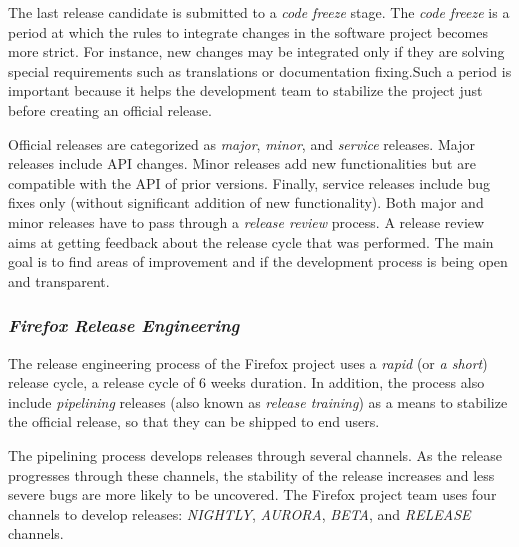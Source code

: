 The last release candidate is submitted to a {\em code freeze} stage. The {\em
code freeze} is a period at which the rules to integrate changes in the software
project becomes more strict. For instance, new changes may be integrated only if
they are solving special requirements such as translations or documentation
fixing.\footnotemark[15] Such a period is important because it helps the
development team to stabilize the project just before creating an official
release.

Official releases are categorized as {\em major}, {\em minor}, and {\em service} 
releases.
Major releases include API changes. Minor releases add new functionalities but
are compatible with the API of prior versions. Finally, service releases include
bug fixes only (\ie without significant addition of new functionality). Both
major and minor releases have to pass through a {\em release review} process. A
release review aims at getting feedback about the release cycle that was
performed. The main goal is to find areas of improvement and if the development
process is being open and
transparent.

\subsubsection*{\textbf{\textit{Firefox Release Engineering}}}\label{firefox:releng}

The release engineering process of the Firefox project uses a {\em rapid} (or
{\em a short}) release cycle, \ie a release cycle of 6 weeks duration. In
addition, the process also include {\em pipelining} releases (also known as {\em
release training}) as a means to stabilize the official release, so that they
can be shipped to end users.

The pipelining process develops releases through several channels.
As the release progresses through these channels, the stability of the release
increases and less severe bugs are more likely to be uncovered. The Firefox project team
uses four channels to develop releases: {\em NIGHTLY}, {\em AURORA}, {\em BETA},
and {\em RELEASE}
channels.

